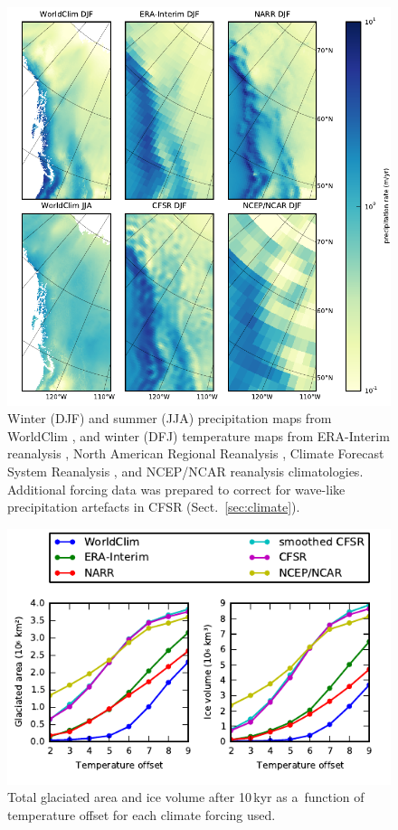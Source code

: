 \documentclass[tc, ms]{copernicus}
\begin{document}
\begin{figure}
  \includegraphics{cordillera-climate-prec}
  \caption{Winter (DJF) and summer (JJA) precipitation maps from WorldClim \citep{data:worldclim}, and winter (DFJ) temperature maps from ERA-Interim reanalysis \citep{data:erai}, North American Regional Reanalysis \citep[NARR;][]{data:narr}, Climate Forecast System Reanalysis \citep[CFSR;][]{data:cfsr}, and NCEP/NCAR reanalysis \citep{data:ncar} climatologies. Additional forcing data was prepared to correct for wave-like precipitation artefacts in CFSR (Sect.~\ref{sec:climate}).}
  \label{fig:prec}
\end{figure}

\begin{figure}
  \includegraphics{cordillera-climate-ivolarea}
  \caption{Total glaciated area and ice volume after 10\,kyr as a~function of temperature offset for each climate forcing used.}
  \label{fig:ivolarea}
\end{figure}
\end{document}
